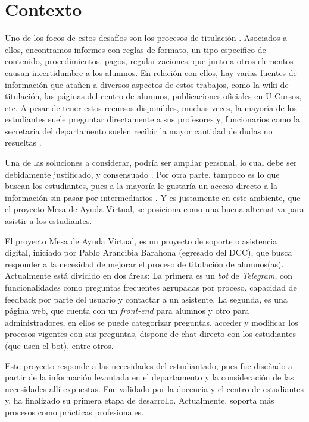 \section{Contexto}\label{sec:intro-con}
    \par Uno de los focos de estos desafíos son los procesos de titulación \cite{ARANCIBIA2021}. Asociados a ellos, encontramos informes con reglas de formato, un tipo específico de contenido, procedimientos, pagos, regularizaciones, que junto a otros elementos causan incertidumbre a los alumnos. En relación con ellos, hay varias fuentes de información que atañen a diversos aspectos de estos trabajos, como la wiki de titulación, las páginas del centro de alumnos, publicaciones oficiales en U-Cursos, etc. A pesar de tener estos recursos disponibles, muchas veces, la mayoría de los estudiantes suele preguntar directamente a sus profesores y, funcionarios como la secretaria del departamento suelen recibir la mayor cantidad de dudas no resueltas \cite{ARANCIBIA2021}.
    \par Una de las soluciones a considerar, podría ser ampliar personal, lo cual debe ser debidamente justificado, y consensuado \cite{Chile2014}. Por otra parte, tampoco es lo que buscan los estudiantes, pues a la mayoría le gustaría un acceso directo a la información sin pasar por intermediarios \cite{ARANCIBIA2021}. Y es justamente en este ambiente, que el proyecto Mesa de Ayuda Virtual, se posiciona como una buena alternativa para asistir a los estudiantes.
    \par El proyecto Mesa de Ayuda Virtual, es un proyecto de soporte o asistencia digital, iniciado por Pablo Arancibia Barahona (egresado del DCC), que busca responder a la necesidad de mejorar el proceso de titulación de alumnos(as). Actualmente está dividido en dos áreas: La primera es un \textit{bot} de \textit{Telegram}, con funcionalidades como preguntas frecuentes agrupadas por proceso, capacidad de feedback por parte del usuario y contactar a un asistente. La segunda, es una página web, que cuenta con un \textit{front-end} para alumnos y otro para administradores, en ellos se puede categorizar preguntas, acceder y modificar los procesos vigentes con sus preguntas, dispone de chat directo con los estudiantes (que usen el bot), entre otros.
    \par Este proyecto responde a las necesidades del estudiantado, pues fue diseñado a partir de la información levantada en el departamento y la consideración de las necesidades allí expuestas. Fue validado por la docencia y el centro de estudiantes y, ha finalizado su primera etapa de desarrollo. Actualmente, soporta más procesos como prácticas profesionales.

